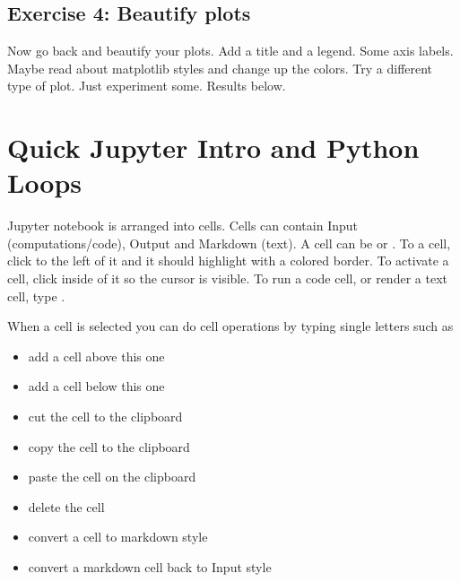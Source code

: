 \documentclass[letterpaper,10pt,english]{jupyterBook}
\begin{document}
\section{Exercise 4: Beautify plots}
\label{\detokenize{lessons/Bayes_Theorem_Student:exercise-4-beautify-plots}}
\sphinxAtStartPar
Now go back and beautify your plots. Add a title and a legend. Some axis labels. Maybe read about matplotlib styles and change up the colors. Try a different type of  plot. Just experiment some. Results below.

\sphinxstepscope


\chapter{Quick Jupyter Intro and Python Loops}
\label{\detokenize{lessons/jupyter-python-intro:quick-jupyter-intro-and-python-loops}}\label{\detokenize{lessons/jupyter-python-intro::doc}}
\sphinxAtStartPar
Jupyter notebook is arranged into cells. Cells can contain Input (computations/code), Output and Markdown (text). A cell can be  or . To  a cell, click to the left of it and it should highlight with a colored border. To activate a cell, click inside of it so the cursor is visible. To run a code cell, or render a text cell, type .

\sphinxAtStartPar
When a cell is selected you can do cell operations by typing single letters such as
\begin{itemize}
\item {} 
\sphinxAtStartPar
{} add a cell above this one

\item {} 
\sphinxAtStartPar
{} add a cell below this one

\item {} 
\sphinxAtStartPar
{} cut the cell to the clipboard

\item {} 
\sphinxAtStartPar
{} copy the cell to the clipboard

\item {} 
\sphinxAtStartPar
{} paste the cell on the clipboard

\item {} 
\sphinxAtStartPar
{} delete the cell

\item {} 
\sphinxAtStartPar
{} convert a cell to markdown style

\item {} 
\sphinxAtStartPar
{} convert a markdown cell back to Input style

\end{itemize}
\end{document}
